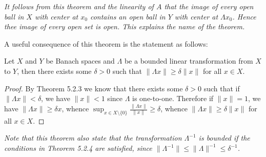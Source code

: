 \begin{note}\em
It follows from this theorem and the linearity of $A$ that the image of every open ball in $X$ with center at $x_0$ contains an open ball in $Y$ with center at $\Lambda x_0$. Hence thee image of every open set is open. This explains the name of the theorem. 
\end{note}
A useful consequence of this theorem is the statement as follows:
\begin{theorem}
Let $X$ and $Y$ be Banach spaces and $\Lambda$ be a bounded linear transformation from $X$ to $Y$, then there exists some $\delta>0$ such that $\|\Lambda x\|\ge\delta\|x\|$ for all $x\in X$.
\end{theorem}
\begin{proof}
By Theorem 5.2.3 we know that there exists some $\delta>0$ such that if $\|\Lambda x\|<\delta$, we have $\|x\|<1$ since $\Lambda$ is one-to-one. Therefore if $\|x\|=1$, we have $\|\Lambda x\|\ge\delta x$, whence $\sup_{x\in X\setminus\{0\}}\frac{\|\Lambda x\|}{\|x\|}\ge\delta$, whence $\|\Lambda x\|\ge\delta\|x\|$ for all $x\in X$.
\end{proof}
\begin{note}\em
Note that this theorem also state that the transformation $\Lambda^{-1}$ is bounded if the conditions in Theorem 5.2.4 are satisfied, since $\|\Lambda^{-1}\|\le\|\Lambda\|^{-1}\le\delta^{-1}$.
\end{note}
